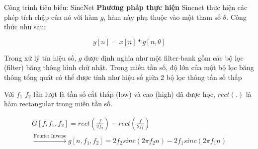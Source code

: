 \documentclass[notheorems, aspectratio=54]{beamer}
\begin{document}
\begin{frame}{Công trình tiêu biểu: SincNet}
	\textbf{Phương pháp thực hiện} Sincnet thực hiện các phép tích chập của nó với hàm $g$, hàm này phụ thuộc vào một tham số $\theta$. Công thức như sau:
	
	$$y[n] = x[n] * g[n, \theta]$$
	
	Trong xử lý tín hiệu số, $g$ được định nghĩa như một filter-bank gồm các bộ lọc (filter) băng thông hình chữ nhật. Trong miền tần số, độ lớn của một bộ lọc băng thông tổng quát có thể được tính như hiệu số giữa 2 bộ lọc thông tần số thấp
	
	Với $f_1$ $f_2$ lần lượt là tần số cắt thấp (low) và cao (high) đã được học, $rect(.)$ là hàm rectangular trong miền tần số.
	
	\begin{gather*}
		G[f, f_1, f_2] = rect\left(\frac{f}{2f_2}\right) -  rect\left(\frac{f}{2f_1}\right)\\ \xrightarrow{\text{Fourier Inverse}}g[n, f_1, f_2] = 2f_2sinc(2\pi f_2 n) - 2f_1sinc(2\pi f_1 n)
	\end{gather*}
\end{frame}
\end{document}
